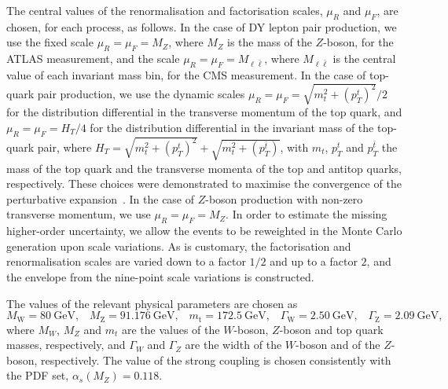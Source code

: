 The central values of the renormalisation and factorisation scales, $\mu_R$ and
$\mu_F$, are chosen, for each process, as follows. In the case of DY lepton pair
production, we use the fixed scale $\mu_R=\mu_F=M_Z$, where $M_Z$ is the mass
of the $Z$-boson, for the ATLAS measurement, and the scale
$\mu_R=\mu_F=M_{\ell\bar\ell}$, where $M_{\ell\bar\ell}$ is the central value of each
invariant mass bin, for the CMS measurement.
In the case of top-quark pair production, we use the dynamic scales
$\mu_R=\mu_F=\sqrt{m_t^2+(p_T^t)^2}{\Big /}2$ for the distribution differential
in the transverse momentum of the top quark, and $\mu_R=\mu_F=H_T/4$ for the
distribution differential in the invariant mass of the top-quark pair, where
$H_T=\sqrt{m_t^2+(p_T^t)^2}+\sqrt{m_t^2+(p_T^{\bar{t}})}$, with $m_t$,
$p_T^t$ and $p_T^{\bar t}$ the mass of the top quark and the transverse momenta
of the top and antitop quarks, respectively. These choices were demonstrated
to maximise the convergence of the perturbative expansion~\cite{Czakon:2016dgf}.
In the case of $Z$-boson production with non-zero transverse momentum, we use
$\mu_R=\mu_F=M_Z$. In order to estimate the missing higher-order uncertainty,
we allow the events to be reweighted in the Monte Carlo generation upon scale
variations. As is customary, the factorisation and renormalisation scales
are varied down to a factor $1/2$ and up to a factor $2$, and the envelope
from the nine-point scale variations is constructed.

The values of the relevant physical parameters are chosen as
\begin{equation}
M_\mathrm{W} = \SI{80}{\giga\electronvolt} \text{,} \quad 
M_\mathrm{Z} = \SI{91.176}{\giga\electronvolt} \text{,} \quad 
m_\mathrm{t} = \SI{172.5}{\giga\electronvolt} \text{,} \quad
\Gamma_\mathrm{W} = \SI{2.50}{\giga\electronvolt} \text{,} \quad
\Gamma_\mathrm{Z} = \SI{2.09}{\giga\electronvolt} \text{,} 
\label{eq:parameters}
\end{equation}
where $M_W$, $M_Z$ and $m_t$ are the values of the $W$-boson, $Z$-boson and
top quark masses, respectively, and $\Gamma_W$ and $\Gamma_Z$ are the width of
the $W$-boson and of the $Z$-boson, respectively. The value of the strong
coupling is chosen consistently with the PDF set, $\alpha_s(M_Z)=0.118$.

